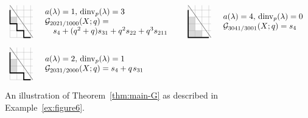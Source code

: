 \documentclass[12pt]{amsart}
\theoremstyle{definition}
\theoremstyle{remark}
\newcommand{\Gcal}{{\mathcal G}}
\DeclareMathOperator{\dinv}{dinv}
\begin{document}
\begin{figure}
\[\begin{array}{ll@{\qquad }ll}
\begin{tikzpicture}[scale=.3,baseline=.6cm]
\draw[draw=none, fill=black!15]  (0,2) rectangle (1,3);
\draw [help lines] (0,0) grid (331/100,47/10);
\draw (0,47/10) -- (331/100,0);
\draw [very thick]  (0,4) -- (0,2) -- (1,2) -- (1,1) -- (2,1) -- (2,0) -- (3,0);
\end{tikzpicture}
&
\begin{array}{l}
a(\lambda ) = 1,\, \dinv _{p} (\lambda ) = 3\\
\Gcal_{ 2021 / 1000}(X;q) = \\
\quad s_{4} + (q^2 + q)s_{31} + q^2s_{22} + q^3s_{211} 
\end{array}
&
\begin{tikzpicture}[scale=.3,baseline=.6cm]
\draw[draw=none, fill=black!15]  (0,0) rectangle (1,3);
\draw[draw=none, fill=black!15]  (1,0) rectangle (2,1);
\draw[help lines] (0,0) grid (331/100,47/10);
\draw (0,47/10) -- (331/100,0);
\draw[very thick] (0,4) -- (0,0) -- (1,0) -- (1,0) -- (2,0) -- (2,0) -- (3,0);
\end{tikzpicture}
&
\begin{array}{l}
a(\lambda ) = 4,\, \dinv _{p} (\lambda ) = 0\\
\Gcal_{ 3041 / 3001}(X;q) = s_{4} 
\end{array}\\[6ex]

\begin{tikzpicture}[scale=.3,baseline=.6cm]
\draw[draw=none, fill=black!15]  (0,1) rectangle (1,3);
\draw [help lines] (0,0) grid (331/100,47/10);
\draw (0,47/10) -- (331/100,0);
\draw [very thick] (0,4) -- (0,1) -- (1,1) -- (1,1) -- (2,1) -- (2,0) -- (3,0);
\end{tikzpicture}
&
\begin{array}{l}
a(\lambda ) = 2,\, \dinv _{p} (\lambda ) = 1\\
\Gcal_{ 2031 / 2000}(X;q) = s_{4} + q\hspace{.3mm} s_{31} 
\end{array}
\end{array}
\]
\caption{\label{fig:main-G}
An illustration of Theorem~\ref{thm:main-G} as described in
Example~\ref{ex:figure6}.}
\end{figure}
\end{document}
